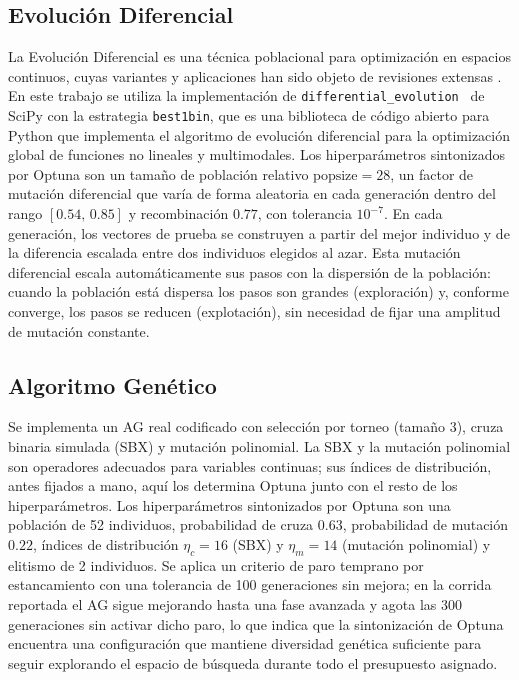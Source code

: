 \documentclass[conference]{IEEEtran}
\begin{document}
\subsection{Evolución Diferencial}
La Evolución Diferencial es una técnica poblacional para optimización en
espacios continuos, cuyas variantes y aplicaciones han sido objeto de revisiones
extensas \cite{ref_de_recent,ref_de_image}. En este trabajo se utiliza la implementación de \texttt{differential\_evolution } de SciPy con la estrategia \texttt{best1bin}, que es una biblioteca de código abierto para Python que implementa el algoritmo de evolución diferencial para la optimización global de funciones no lineales y multimodales. Los hiperparámetros sintonizados por Optuna son
un tamaño de población relativo $\text{popsize}=28$, un factor de mutación
diferencial que varía de forma aleatoria en cada generación dentro del rango
$[0.54,\,0.85]$ y recombinación $0.77$, con tolerancia $10^{-7}$. En cada
generación, los vectores de prueba se construyen a partir del mejor individuo y
de la diferencia escalada entre dos individuos elegidos al azar. Esta mutación
diferencial escala automáticamente sus pasos con la dispersión de la población:
cuando la población está dispersa los pasos son grandes (exploración) y,
conforme converge, los pasos se reducen (explotación), sin necesidad de fijar
una amplitud de mutación constante.

\subsection{Algoritmo Genético}
Se implementa un AG real codificado con selección por torneo (tamaño 3), cruza
binaria simulada (SBX) \cite{ref_sbx} y mutación polinomial. La SBX y la mutación polinomial son operadores adecuados para variables
continuas; sus índices de distribución, antes fijados a mano, aquí los determina
Optuna junto con el resto de los hiperparámetros. Los hiperparámetros
sintonizados por Optuna son una población de 52 individuos, probabilidad de
cruza $0.63$, probabilidad de mutación $0.22$, índices de distribución
$\eta_c=16$ (SBX) y $\eta_m=14$ (mutación polinomial) y elitismo de 2 individuos. Se aplica un criterio de paro
temprano por estancamiento con una tolerancia de 100 generaciones sin mejora; en
la corrida reportada el AG sigue mejorando hasta una fase avanzada y agota las
300 generaciones sin activar dicho paro, lo que indica que la sintonización de
Optuna encuentra una configuración que mantiene diversidad genética suficiente
para seguir explorando el espacio de búsqueda durante todo el presupuesto
asignado.
\end{document}
